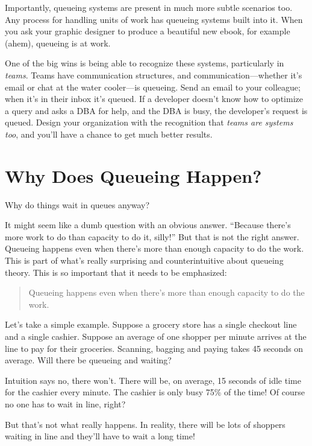 \documentclass{vivid_layout_pdf}
\begin{document}
Importantly, queueing systems are present in much more subtle scenarios too. Any process for handling units of work has queueing systems built into it. When you ask your graphic designer to produce a beautiful new ebook, for example (ahem), queueing is at work.

One of the big wins is being able to recognize these systems, particularly in {\itshape teams}. Teams have communication structures, and communication---whether it's email or chat at the water cooler---is queueing. Send an email to your colleague; when it's in their inbox it's queued. If a developer doesn't know how to optimize a query and asks a DBA for help, and the DBA is busy, the developer's request is queued. Design your organization with the recognition that {\itshape teams are systems too}, and you'll have a chance to get much better results.

\section{Why Does Queueing Happen?}

Why do things wait in queues anyway?

It might seem like a dumb question with an obvious answer. ``Because there's more work to do than capacity to do it, silly!'' But that is not the right answer. Queueing happens even when there's more than enough capacity to do the work. This is part of what's really surprising and counterintuitive about queueing theory. This is so important that it needs to be emphasized:

\begin{quote}
Queueing happens even when there's more than enough capacity to do the work.
\end{quote}

Let's take a simple example. Suppose a grocery store has a single checkout line and a single cashier. Suppose an average of one shopper per minute arrives at the line to pay for their groceries. Scanning, bagging and paying takes 45 seconds on average. Will there be queueing and waiting?

Intuition says no, there won't. There will be, on average, 15 seconds of idle time for the cashier every minute. The cashier is only busy 75\% of the time! Of course no one has to wait in line, right?

But that's not what really happens. In reality, there will be lots of shoppers waiting in line and they'll have to wait a long time!
\end{document}
